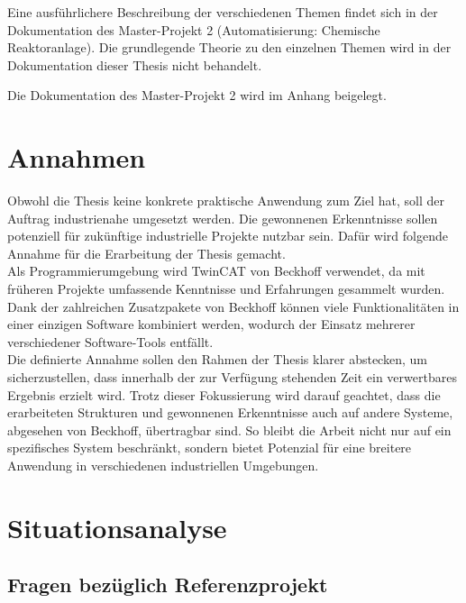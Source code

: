 	Eine ausführlichere Beschreibung der verschiedenen Themen findet sich in der Dokumentation des Master-Projekt 2 (Automatisierung: Chemische Reaktoranlage). Die grundlegende Theorie zu den einzelnen Themen wird in der  Dokumentation dieser Thesis nicht behandelt. 
	\\
	\begin{bfhNoteBox}
		Die Dokumentation des Master-Projekt 2 wird im Anhang beigelegt.
	\end{bfhNoteBox} 
	
	\newpage
	
\section{Annahmen} \label{Annahmen}
	Obwohl die Thesis keine konkrete praktische Anwendung zum Ziel hat, soll der Auftrag industrienahe umgesetzt werden. Die gewonnenen Erkenntnisse sollen potenziell für zukünftige industrielle Projekte nutzbar sein. Dafür wird folgende Annahme für die Erarbeitung der Thesis gemacht. 
	\\
	Als Programmierumgebung wird TwinCAT von Beckhoff verwendet, da mit früheren Projekte umfassende Kenntnisse und Erfahrungen gesammelt wurden. Dank der zahlreichen Zusatzpakete von Beckhoff können viele Funktionalitäten in einer einzigen Software kombiniert werden, wodurch der Einsatz mehrerer verschiedener Software-Tools entfällt.
	\\ 
	Die definierte Annahme sollen den Rahmen der Thesis klarer abstecken, um sicherzustellen, dass innerhalb der zur Verfügung stehenden Zeit ein verwertbares Ergebnis erzielt wird. Trotz dieser Fokussierung wird darauf geachtet, dass die erarbeiteten Strukturen und gewonnenen Erkenntnisse auch auf andere Systeme, abgesehen von Beckhoff, übertragbar sind. So bleibt die Arbeit nicht nur auf ein spezifisches System beschränkt, sondern bietet Potenzial für eine breitere Anwendung in verschiedenen industriellen Umgebungen.
	

\section{Situationsanalyse} \label{Situationsanalyse}

	\subsection{Fragen bezüglich Referenzprojekt} \label{Fragen bezüglich Referenzprojekt}
	
